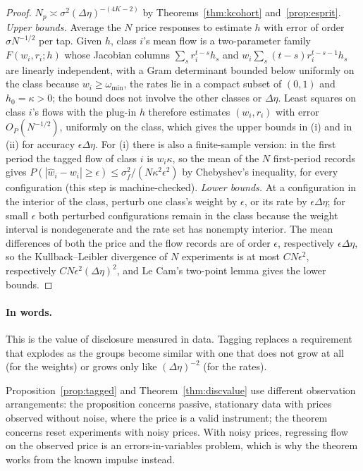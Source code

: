 \begin{proof}
$N_p\asymp\sigma^2(\Delta\eta)^{-(4K-2)}$ by Theorems~\ref{thm:kcohort} and~\ref{prop:esprit}. \emph{Upper bounds.} Average the $N$ price responses to estimate $h$ with error of order $\sigma N^{-1/2}$ per tap. Given $h$, class $i$'s mean flow is a two-parameter family $F(w_i,r_i;h)$ whose Jacobian columns $\sum_sr_i^{t-s}h_s$ and $w_i\sum_s(t-s)r_i^{t-s-1}h_s$ are linearly independent, with a Gram determinant bounded below uniformly on the class because $w_i\ge\omega_{\min}$, the rates lie in a compact subset of $(0,1)$ and $h_0=\kappa>0$; the bound does not involve the other classes or $\Delta\eta$. Least squares on class $i$'s flows with the plug-in $h$ therefore estimates $(w_i,r_i)$ with error $O_P(N^{-1/2})$, uniformly on the class, which gives the upper bounds in (i) and in (ii) for accuracy $\epsilon\Delta\eta$. For (i) there is also a finite-sample version: in the first period the tagged flow of class $i$ is $w_i\kappa$, so the mean of the $N$ first-period records gives $P(|\hat w_i-w_i|\ge\epsilon)\le\sigma_f^2/(N\kappa^2\epsilon^2)$ by Chebyshev's inequality, for every configuration (this step is machine-checked). \emph{Lower bounds.} At a configuration in the interior of the class, perturb one class's weight by $\epsilon$, or its rate by $\epsilon\Delta\eta$; for small $\epsilon$ both perturbed configurations remain in the class because the weight interval is nondegenerate and the rate set has nonempty interior. The mean differences of both the price and the flow records are of order $\epsilon$, respectively $\epsilon\Delta\eta$, so the Kullback--Leibler divergence of $N$ experiments is at most $CN\epsilon^2$, respectively $CN\epsilon^2(\Delta\eta)^2$, and Le Cam's two-point lemma gives the lower bounds.
\end{proof}

\paragraph{In words.} This is the value of disclosure measured in data. Tagging replaces a requirement that explodes as the groups become similar with one that does not grow at all (for the weights) or grows only like $(\Delta\eta)^{-2}$ (for the rates).


Proposition~\ref{prop:tagged} and Theorem~\ref{thm:discvalue} use different observation arrangements: the proposition concerns passive, stationary data with prices observed without noise, where the price is a valid instrument; the theorem concerns reset experiments with noisy prices. With noisy prices, regressing flow on the observed price is an errors-in-variables problem, which is why the theorem works from the known impulse instead.

